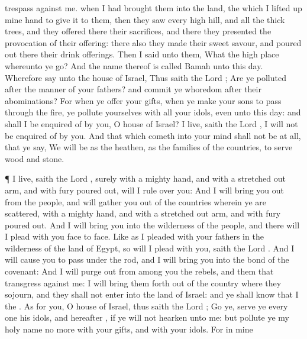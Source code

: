 {trespass against me.
 when I had
brought them into the
land,
{} the which I lifted
up mine
hand to
give it to them, then they
saw every
high
hill, and all the
thick
trees, and they
offered there their
sacrifices, and there they
presented the
provocation of their
offering: there also they
made their
sweet
savour, and poured
out there their drink
offerings.
Then I
said unto them, What
{} the high
place whereunto ye
go? And the
name thereof is
called
Bamah unto this
day.
Wherefore
say unto the
house of
Israel, Thus
saith the
Lord
{}; Are ye
polluted after the
manner of your
fathers? and commit ye
whoredom
after their
abominations?
For when ye
offer your
gifts, when ye make your
sons to pass
through the
fire, ye
pollute yourselves with all your
idols, even unto this
day: and shall I be
enquired of by you, O
house of
Israel?
{} I
live,
saith the
Lord
{}, I will not be
enquired of by you.
And that which
cometh into your
mind shall not be at all, that ye
say, We will
be as the
heathen, as the
families of the
countries, to
serve
wood and
stone.
\par }{\PP {}¶
{} I
live,
saith the
Lord
{}, surely with a
mighty
hand, and with a stretched
out
arm, and with
fury poured
out, will I
rule over you:
And I will bring you
out from the
people, and will
gather you out of the
countries wherein ye are
scattered, with a
mighty
hand, and with a stretched
out
arm, and with
fury poured
out.
And I will
bring you into the
wilderness of the
people, and there will I
plead with you
face to
face.
Like as I
pleaded with your
fathers in the
wilderness of the
land of
Egypt, so will I
plead with you,
saith the
Lord
{}.
And I will cause you to
pass under the
rod, and I will
bring you into the
bond of the
covenant:
And I will purge
out from among you the
rebels, and them that
transgress against me: I will bring them
forth out of the
country where they
sojourn, and they shall not
enter into the
land of
Israel: and ye shall
know that I
{} the
{}.
As for you, O
house of
Israel, thus
saith the
Lord
{};
Go ye,
serve ye every
one his
idols, and
hereafter
{}, if ye will not
hearken unto me: but
pollute ye my
holy
name no more with your
gifts, and with your
idols.
For in mine
}
